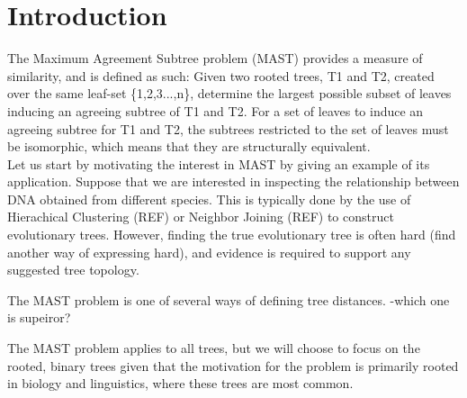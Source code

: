 \chapter{Introduction}
\label{ch:intro}
The Maximum Agreement Subtree problem (MAST) provides a  measure of similarity, and is defined as such: Given two rooted trees, T1 and T2, created over the same leaf-set \{1,2,3...,n\}, determine the largest possible subset of leaves inducing an agreeing subtree of T1 and T2. For a set of leaves to induce an agreeing subtree for T1 and T2, the subtrees restricted to the set of leaves must be isomorphic, which means that they are structurally equivalent.
\\

Let us start by motivating the interest in MAST by giving an example of its application. Suppose that we are interested in inspecting the relationship between DNA obtained from different species. This is typically done by the use of  Hierachical Clustering (REF) or Neighbor Joining (REF) to construct evolutionary trees. However, finding the true evolutionary tree is often hard (find another way of expressing hard), and evidence is required to support any suggested tree topology.  




The MAST problem is one of several ways of defining tree distances. -which one is supeiror?



The MAST problem applies to all trees, but we will choose to focus on the rooted, binary trees given that the motivation for the problem is primarily rooted in biology and linguistics, where these trees are most common.  


\todo{\dots}